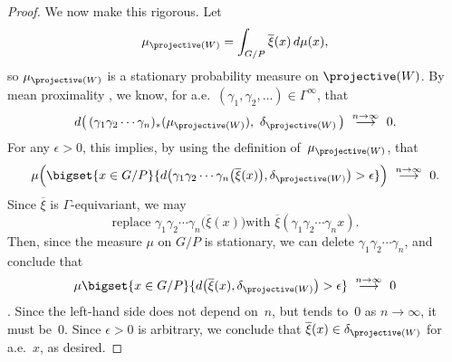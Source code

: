 \begin{proof}
We now make this rigorous. Let
	$$ \mu_{\projective(W)} = \int_{G/P} \overline{\xi}(x) \, d\mu(x) , $$
so $\mu_{\projective(W)}$ is a stationary probability measure on $\projective(W)$. By mean proximality , we know, for a.e.\ $(\gamma_1,\gamma_2,\ldots) \in \Gamma^\infty$, that
	$$ d \bigl( \, (\gamma_1 \gamma_2 \cdots \gamma_n)_*(\mu_{\projective(W)}), \ \delta_{\projective(W)} \, \bigr) \ \stackrel{n \to \infty}{\longrightarrow} \ 0 .$$
For any $\epsilon > 0$, this implies, by using the definition of~$\mu_{\projective(W)}$, that
	$$ \mu \Bigl( \bigset{ x \in G/P }{ d \bigl( \gamma_1 \gamma_2 \cdots \gamma_n \bigl( \overline{\xi}(x) \bigr) 
	, \delta_{\projective(W)} \bigr)  > \epsilon } \Bigr) \ \stackrel{n \to \infty}{\longrightarrow} \ 0 .$$
Since $\overline{\xi}$ is $\Gamma$-equivariant, we may
	$$ \text{replace \ $\gamma_1 \gamma_2 \cdots \gamma_n \bigl( \overline{\xi}(x) \bigr)$
	\ with \ $\overline{\xi}( \gamma_1 \gamma_2 \cdots \gamma_n  x)$} .$$
Then, since the measure $\mu$ on $G/P$ is stationary, we can delete $\gamma_1 \gamma_2 \cdots \gamma_n$, and conclude that
	\begin{align} \label{DeleteGamma}
	 \mu
	\bigset{ x \in G/P }{ 
	d \bigl( \overline{\xi}(x) 
	, \delta_{\projective(W)} \bigr)  > \epsilon } \ \stackrel{n \to \infty}{\longrightarrow} \ 0 
	\end{align}
.
Since the left-hand side does not depend on~$n$, but tends to~$0$ as $n \to \infty$, it must be~$0$. Since $\epsilon > 0$ is arbitrary, we conclude that $\overline{\xi}(x)  \in \delta_{\projective(W)}$ for a.e.~$x$, as desired.
\end{proof}


